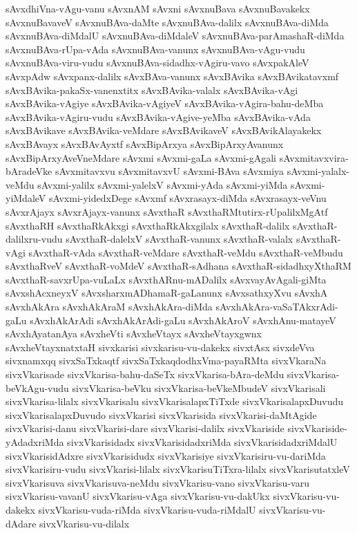 {sAvxdhiVna-vAgu-vanu
sAvxnAM
sAvxni
sAvxnuBava
sAvxnuBavakekx
sAvxnuBavaveV
sAvxnuBAva-daMte
sAvxnuBAva-dalilx
sAvxnuBAva-diMda
sAvxnuBAva-diMdalU
sAvxnuBAva-diMdaleV
sAvxnuBAva-parAmashaR-diMda
sAvxnuBAva-rUpa-vAda
sAvxnuBAva-vanunx
sAvxnuBAva-vAgu-vudu
sAvxnuBAva-viru-vudu
sAvxnuBAva-sidadhx-vAgiru-vavo
sAvxpakAleV
sAvxpAdw
sAvxpanx-dalilx
sAvxBAva-vanunx
sAvxBAvika
sAvxBAvikatavxmf
sAvxBAvika-pakaSx-vanenxtitx
sAvxBAvika-valalx
sAvxBAvika-vAgi
sAvxBAvika-vAgiye
sAvxBAvika-vAgiyeV
sAvxBAvika-vAgira-bahu-deMba
sAvxBAvika-vAgiru-vudu
sAvxBAvika-vAgive-yeMba
sAvxBAvika-vAda
sAvxBAvikave
sAvxBAvika-veMdare
sAvxBAvikaveV
sAvxBAvikAlayakekx
sAvxBAvayx
sAvxBAvAyxtf
sAvxBipArxya
sAvxBipArxyAvanunx
sAvxBipArxyAveVneMdare
sAvxmi
sAvxmi-gaLa
sAvxmi-gAgali
sAvxmitavxvira-bAradeVke
sAvxmitavxvu
sAvxmitavxvU
sAvxmi-BAva
sAvxmiya
sAvxmi-yalalx-veMdu
sAvxmi-yalilx
sAvxmi-yalelxV
sAvxmi-yAda
sAvxmi-yiMda
sAvxmi-yiMdaleV
sAvxmi-yidedxDege
sAvxmf
sAvxrasayx-diMda
sAvxrasayx-veVnu
sAvxrAjayx
sAvxrAjayx-vanunx
sAvxthaR
sAvxthaRMtutirx-rUpalilxMgAtf
sAvxthaRH
sAvxthaRkAkxgi
sAvxthaRkAkxgilalx
sAvxthaR-dalilx
sAvxthaR-dalilxru-vudu
sAvxthaR-dalelxV
sAvxthaR-vanunx
sAvxthaR-valalx
sAvxthaR-vAgi
sAvxthaR-vAda
sAvxthaR-veMdare
sAvxthaR-veMdu
sAvxthaR-veMbudu
sAvxthaRveV
sAvxthaR-voMdeV
sAvxthaR-sAdhana
sAvxthaR-sidadhxyXthaRM
sAvxthaR-savxrUpa-vuLaLx
sAvxthARnu-mADalilx
sAvxvayAvAgali-giMta
sAvxshAcxneyxV
sAvxsharxmADhamaR-gaLanunx
sAvxsathxyXvu
sAvxhA
sAvxhAkAra
sAvxhAkAraM
sAvxhAkAra-diMda
sAvxhAkAra-vaSaTAkxrAdi-gaLu
sAvxhAkArAdi
sAvxhAkArAdi-gaLu
sAvxhAkAroV
sAvxhAnu-matayeV
sAvxhAyatanAya
sAvxheVti
sAvxheVtayx
sAvxheVtayxgwnx
sAvxheVtayxnatxtaH
sivxkarisi
sivxkarisu-vu-dakekx
sivxtAsx
sivxdeVva
sivxnamxqq
sivxSaTxkaqtf
sivxSaTxkaqdodhxVma-payaRMta
sivxVkaraNa
sivxVkarisade
sivxVkarisa-bahu-daSeTx
sivxVkarisa-bAra-deMdu
sivxVkarisa-beVkAgu-vudu
sivxVkarisa-beVku
sivxVkarisa-beVkeMbudeV
sivxVkarisali
sivxVkarisa-lilalx
sivxVkarisalu
sivxVkarisalapxTiTxde
sivxVkarisalapxDuvudu
sivxVkarisalapxDuvudo
sivxVkarisi
sivxVkarisida
sivxVkarisi-daMtAgide
sivxVkarisi-danu
sivxVkarisi-dare
sivxVkarisi-dalilx
sivxVkariside
sivxVkariside-yAdadxriMda
sivxVkarisidadx
sivxVkarisidadxriMda
sivxVkarisidadxriMdalU
sivxVkarisidAdxre
sivxVkarisidudx
sivxVkarisiye
sivxVkarisiru-vu-dariMda
sivxVkarisiru-vudu
sivxVkarisi-lilalx
sivxVkarisuTiTxra-lilalx
sivxVkarisutatxleV
sivxVkarisuva
sivxVkarisuva-neMdu
sivxVkarisu-vano
sivxVkarisu-varu
sivxVkarisu-vavanU
sivxVkarisu-vAga
sivxVkarisu-vu-dakUkx
sivxVkarisu-vu-dakekx
sivxVkarisu-vuda-riMda
sivxVkarisu-vuda-riMdalU
sivxVkarisu-vu-dAdare
sivxVkarisu-vu-dilalx
}
